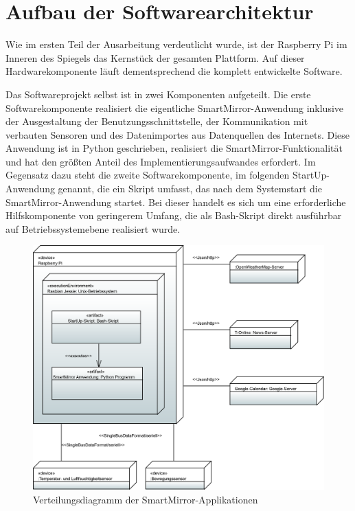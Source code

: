 \section{Aufbau der Softwarearchitektur}
\label{sec:softwarearchitektur}
Wie im ersten Teil der Ausarbeitung verdeutlicht wurde, ist der Raspberry Pi im Inneren des Spiegels das Kernstück der gesamten Plattform. Auf dieser Hardwarekomponente läuft dementsprechend die komplett entwickelte Software. 

Das Softwareprojekt selbst ist in zwei Komponenten aufgeteilt. Die erste Softwarekomponente realisiert die eigentliche SmartMirror-Anwendung inklusive der Ausgestaltung der Benutzungsschnittstelle, der Kommunikation mit verbauten Sensoren und des Datenimportes aus Datenquellen des Internets. Diese Anwendung ist in Python geschrieben, realisiert die SmartMirror-Funktionalität und hat den größten Anteil des Implementierungsaufwandes erfordert. Im Gegensatz dazu steht die zweite Softwarekomponente, im folgenden StartUp-Anwendung genannt, die ein Skript umfasst, das nach dem Systemstart die SmartMirror-Anwendung startet. Bei dieser handelt es sich um eine erforderliche Hilfskomponente von geringerem Umfang, die als Bash-Skript direkt ausführbar auf Betriebssystemebene realisiert wurde.  

\begin{figure}
	\centering
	\includegraphics[width=0.8\linewidth]{bilder/DeploymentDiagram}
	\caption[Verteilungsdiagramm der SmartMirror-Applikationen]{Verteilungsdiagramm der SmartMirror-Applikationen}
	\label{fig:verteilungsdiagramm}
\end{figure}

